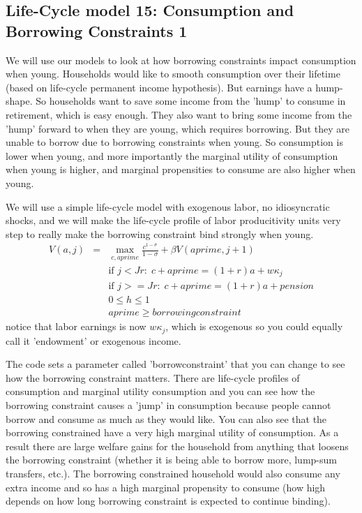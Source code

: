 
\subsection{Life-Cycle model 15: Consumption and Borrowing Constraints 1}
We will use our models to look at how borrowing constraints impact consumption when young. Households would like to smooth consumption over their lifetime (based on life-cycle permanent income hypothesis). But earnings have a hump-shape. So households want to save some income from the 'hump' to consume in retirement, which is easy enough. They also want to bring some income from the 'hump' forward to when they are young, which requires borrowing. But they are unable to borrow due to borrowing constraints when young. So consumption is lower when young, and more importantly the marginal utility of consumption when young is higher, and marginal propensities to consume are also higher when young.

We will use a simple life-cycle model with exogenous labor, no idiosyncratic shocks, and we will make the life-cycle profile of labor producitivity units very step to really make the borrowing constraint bind strongly when young.
\begin{eqnarray*}
 V(a,j)&=& \max_{c,aprime} \frac{c^{1-\sigma}}{1-\sigma} + \beta V(aprime,j+1) \\
&& \text{if }j<Jr: \; c+aprime=(1+r)a+w \kappa_j \\
&& \text{if }j>=Jr: \; c+aprime=(1+r)a +pension\\
&& 0\leq h \leq 1 \\
&& aprime \geq borrowingconstraint
\end{eqnarray*}
notice that labor earnings is now $w \kappa_j$, which is exogenous so you could equally call it 'endowment' or exogenous income.

The code sets a parameter called 'borrowconstraint' that you can change to see how the borrowing constraint matters. There are life-cycle profiles of consumption and marginal utility consumption and you can see how the borrowing constraint causes a 'jump' in consumption because people cannot borrow and consume as much as they would like. You can also see that the borrowing constrained have a very high marginal utility of consumption. As a result there are large welfare gains for the household from anything that loosens the borrowing constraint (whether it is being able to borrow more, lump-sum transfers, etc.). The borrowing constrained household would also consume any extra income and so has a high marginal propensity to consume (how high depends on how long borrowing constraint is expected to continue binding).

